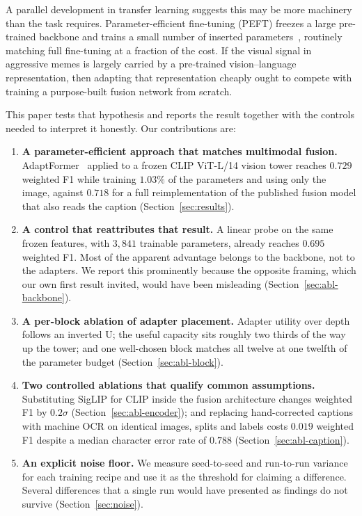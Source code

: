 \documentclass[conference]{IEEEtran}
\begin{document}
A parallel development in transfer learning suggests this may be more machinery
than the task requires. Parameter-efficient fine-tuning (PEFT) freezes a large
pre-trained backbone and trains a small number of inserted
parameters~\cite{houlsby2019,hu2021,chen2022}, routinely matching full
fine-tuning at a fraction of the cost. If the visual signal in aggressive memes
is largely carried by a pre-trained vision--language representation, then
adapting that representation cheaply ought to compete with training a
purpose-built fusion network from scratch.

This paper tests that hypothesis and reports the result together with the
controls needed to interpret it honestly. Our contributions are:

\begin{enumerate}
\item \textbf{A parameter-efficient approach that matches multimodal fusion.}
AdaptFormer~\cite{chen2022} applied to a frozen CLIP ViT-L/14 vision tower
reaches $0.729$ weighted F1 while training $1.03\%$ of the parameters and using
only the image, against $0.718$ for a full reimplementation of the published
fusion model that also reads the caption (Section~\ref{sec:results}).

\item \textbf{A control that reattributes that result.} A linear probe on the
same frozen features, with $3{,}841$ trainable parameters, already reaches
$0.695$ weighted F1. Most of the apparent advantage belongs to the backbone, not
to the adapters. We report this prominently because the opposite framing, which
our own first result invited, would have been misleading
(Section~\ref{sec:abl-backbone}).

\item \textbf{A per-block ablation of adapter placement.} Adapter utility over
depth follows an inverted U; the useful capacity sits roughly two thirds of the
way up the tower; and one well-chosen block matches all twelve at one twelfth of
the parameter budget (Section~\ref{sec:abl-block}).

\item \textbf{Two controlled ablations that qualify common assumptions.}
Substituting SigLIP for CLIP inside the fusion architecture changes weighted F1
by $0.2\sigma$ (Section~\ref{sec:abl-encoder}); and replacing hand-corrected
captions with machine OCR on identical images, splits and labels costs $0.019$
weighted F1 despite a median character error rate of $0.788$
(Section~\ref{sec:abl-caption}).

\item \textbf{An explicit noise floor.} We measure seed-to-seed and
run-to-run variance for each training recipe and use it as the threshold for
claiming a difference. Several differences that a single run would have
presented as findings do not survive (Section~\ref{sec:noise}).
\end{enumerate}
\end{document}

